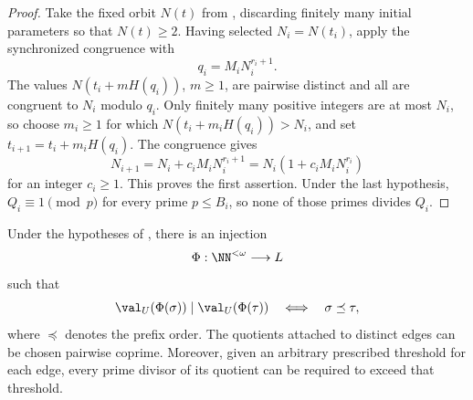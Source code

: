 \begin{proof}
  Take the fixed orbit \(N(t)\) from
  , discarding finitely many
  initial parameters so that \(N(t)\ge2\). Having selected
  \(N_i=N(t_i)\), apply the synchronized congruence with
  \[
    q_i=M_iN_i^{r_i+1}.
  \]
  The values \(N(t_i+mH(q_i))\), \(m\ge1\), are pairwise distinct and all
  are congruent to \(N_i\) modulo \(q_i\). Only finitely many positive
  integers are at most \(N_i\), so choose \(m_i\ge1\) for which
  \(N(t_i+m_iH(q_i))>N_i\), and set
  \(t_{i+1}=t_i+m_iH(q_i)\). The congruence gives
  \[
    N_{i+1}=N_i+c_iM_iN_i^{r_i+1}
           =N_i(1+c_iM_iN_i^{r_i})
  \]
  for an integer \(c_i\ge1\). This proves the first assertion. Under
  the last hypothesis, \(Q_i\equiv1\pmod p\) for every prime
  \(p\le B_i\), so none of those primes divides \(Q_i\).
\end{proof}

\begin{theorem}
  \label{thm:unit-mcfl-divisibility-tree}
  Under the hypotheses of
  , there is an injection
  \[
    \Phi:\NN^{<\omega}\longrightarrow L
  \]
  such that
  \[
    \val_U(\Phi(\sigma))\mid\val_U(\Phi(\tau))
      \quad\Longleftrightarrow\quad \sigma\preceq\tau,
  \]
  where \(\preceq\) denotes the prefix order. The quotients attached to
  distinct edges can be chosen pairwise coprime. Moreover, given an
  arbitrary prescribed threshold for each edge, every prime divisor of
  its quotient can be required to exceed that threshold.
\end{theorem}

